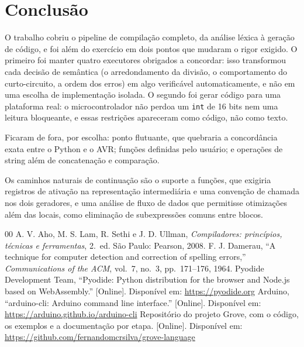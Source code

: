 \documentclass[conference]{IEEEtran}
\begin{document}
\section{Conclusão}

O trabalho cobriu o pipeline de compilação completo, da análise léxica à geração de código, e foi além do exercício em dois pontos que mudaram o rigor exigido. O primeiro foi manter quatro executores obrigados a concordar: isso transformou cada decisão de semântica (o arredondamento da divisão, o comportamento do curto-circuito, a ordem dos erros) em algo verificável automaticamente, e não em uma escolha de implementação isolada. O segundo foi gerar código para uma plataforma real: o microcontrolador não perdoa um \texttt{int} de 16 bits nem uma leitura bloqueante, e essas restrições apareceram como código, não como texto.

Ficaram de fora, por escolha: ponto flutuante, que quebraria a concordância exata entre o Python e o AVR; funções definidas pelo usuário; e operações de string além de concatenação e comparação.

Os caminhos naturais de continuação são o suporte a funções, que exigiria registros de ativação na representação intermediária e uma convenção de chamada nos dois geradores, e uma análise de fluxo de dados que permitisse otimizações além das locais, como eliminação de subexpressões comuns entre blocos.

\begin{thebibliography}{00}
 A. V. Aho, M. S. Lam, R. Sethi e J. D. Ullman, \emph{Compiladores: princípios, técnicas e ferramentas}, 2.\ ed. São Paulo: Pearson, 2008.
 F. J. Damerau, ``A technique for computer detection and correction of spelling errors,'' \emph{Communications of the ACM}, vol.~7, no.~3, pp.~171--176, 1964.
 Pyodide Development Team, ``Pyodide: Python distribution for the browser and Node.js based on WebAssembly.'' [Online]. Disponível em: \url{https://pyodide.org}
 Arduino, ``arduino-cli: Arduino command line interface.'' [Online]. Disponível em: \url{https://arduino.github.io/arduino-cli}
 Repositório do projeto Grove, com o código, os exemplos e a documentação por etapa. [Online]. Disponível em: \url{https://github.com/fernandomcrsilva/grove-language}
\end{thebibliography}
\end{document}
